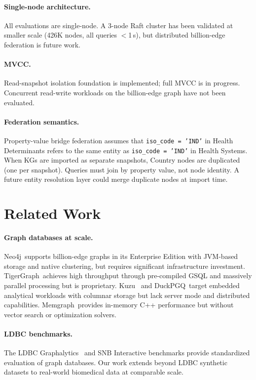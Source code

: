 \documentclass[11pt]{article}
\begin{document}
\paragraph{Single-node architecture.} All evaluations are single-node. A 3-node Raft cluster has been validated at smaller scale (426K nodes, all queries $<$1\,s), but distributed billion-edge federation is future work.

\paragraph{MVCC.} Read-snapshot isolation foundation is implemented; full MVCC is in progress. Concurrent read-write workloads on the billion-edge graph have not been evaluated.

\paragraph{Federation semantics.} Property-value bridge federation assumes that \texttt{iso\_code = 'IND'} in Health Determinants refers to the same entity as \texttt{iso\_code = 'IND'} in Health Systems. When KGs are imported as separate snapshots, Country nodes are duplicated (one per snapshot). Queries must join by property value, not node identity. A future entity resolution layer could merge duplicate nodes at import time.

\section{Related Work}
\label{sec:related}

\paragraph{Graph databases at scale.} Neo4j~supports billion-edge graphs in its Enterprise Edition with JVM-based storage and native clustering, but requires significant infrastructure investment. TigerGraph~achieves high throughput through pre-compiled GSQL and massively parallel processing but is proprietary. Kuzu~\citep{jin2023kuzu} and DuckPGQ~target embedded analytical workloads with columnar storage but lack server mode and distributed capabilities. Memgraph~provides in-memory C++ performance but without vector search or optimization solvers.

\paragraph{LDBC benchmarks.} The LDBC Graphalytics~\citep{iosup2016ldbc} and SNB Interactive benchmarks provide standardized evaluation of graph databases. Our work extends beyond LDBC synthetic datasets to real-world biomedical data at comparable scale.
\end{document}
